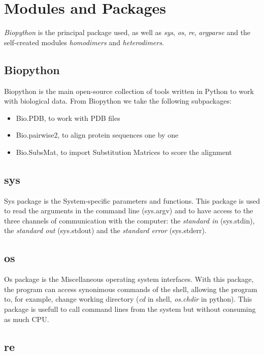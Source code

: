 \documentclass[a4paper,12pt]{report}
\begin{document}
\section{Modules and Packages}

\textit{Biopython} is the principal package used, as well as \textit{sys}, \textit{os}, \textit{re}, \textit{argparse} and the self-created modules \textit{homodimers} and \textit{heterodimers}. 

\subsection{Biopython}

Biopython is the main open-source collection of tools written in Python to work with biological data. From Biopython we take the following subpackages:

\begin{itemize}
 \item Bio.PDB, to work with PDB files
 \item Bio.pairwise2, to align protein sequences one by one
 \item Bio.SubsMat, to import Substitution Matrices to score the alignment
\end{itemize}


\subsection{sys}

Sys package is the System-specific parameters and functions. This package is used to read the arguments in the command line (sys.argv) and to have access to the three channels of communication with the computer: the \textit{standard in} (sys.stdin), the \textit{standard out} (sys.stdout) and the \textit{standard error} (sys.stderr).

\subsection{os}

Os package is the Miscellaneous operating system interfaces. With this package, the program can access synonimous commands of the shell, allowing the program to, for example, change working directory (\textit{cd} in shell, \textit{os.chdir} in python). 
This package is usefull to call command lines from the system but without consuming as much CPU.

\subsection{re}
\end{document}
